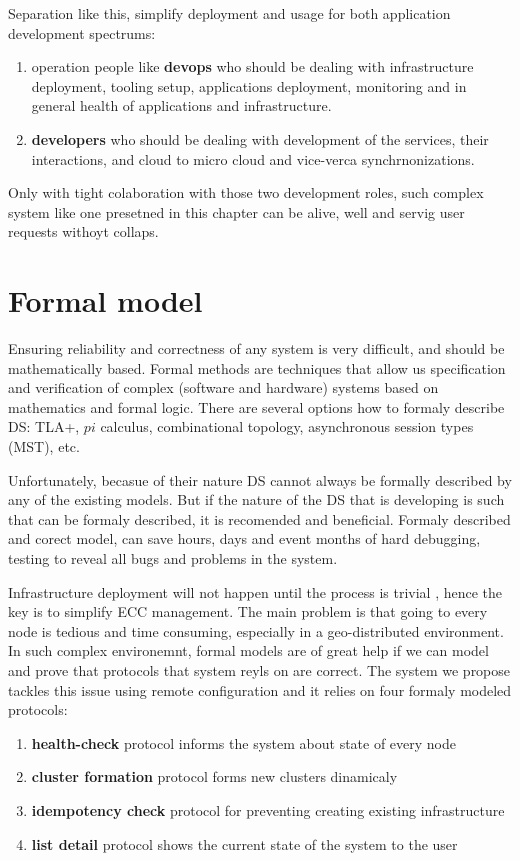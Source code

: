 Separation like this, simplify deployment and usage for both application development spectrums: 

\begin{enumerate}[start=1,label={(\bfseries \roman*)}]
	\item operation people like \textbf{devops} who should be dealing with infrastructure deployment, tooling setup, applications deployment, monitoring and in general health of applications and infrastructure.
	\item \textbf{developers} who should be dealing with development of the services, their interactions, and cloud to micro cloud and vice-verca synchrnonizations.
\end{enumerate}

Only with tight colaboration with those two development roles, such complex system like one presetned in this chapter can be alive, well and servig user requests withoyt collaps.
%
%
\section{Formal model}\label{sec:formal_model}
%
Ensuring reliability and correctness of any system is very difficult, and should be mathematically based. Formal methods are techniques that allow us specification and verification of complex (software and hardware) systems based on mathematics and formal logic. There are several options how to formaly describe DS: TLA+, $pi$ calculus, combinational topology, asynchronous session types (MST), etc. 

Unfortunately, becasue of their nature DS cannot always be formally described by any of the existing models. But if the nature of the DS that is developing is such that can be formaly described, it is recomended and beneficial. Formaly described and corect model, can save hours, days and event months of hard debugging, testing to reveal all bugs and problems in the system.

Infrastructure deployment will not happen until the process is trivial \cite{SatyanarayananBCD09}, hence the key is to simplify ECC management. The main problem is that going to every node is tedious and time consuming, especially in a geo-distributed environment. In such complex environemnt, formal models are of great help if we can model and prove that protocols that system reyls on are correct. The system we propose tackles this issue using remote configuration and it relies on four formaly modeled protocols: 

\begin{enumerate}[start=1,label={(\bfseries \arabic*)}]
	\item \textbf{health-check} protocol informs the system about state of every node 
	\item \textbf{cluster formation} protocol forms new clusters dinamicaly
	\item \textbf{idempotency check} protocol for preventing creating existing infrastructure
	\item \textbf{list detail} protocol shows the current state of the system to the user
\end{enumerate}

